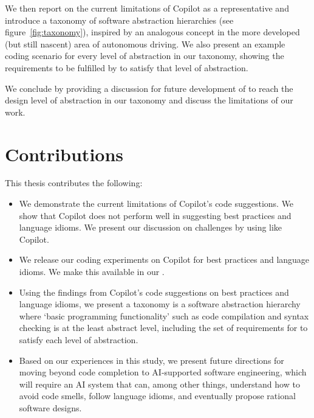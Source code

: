 We then report on the current limitations of Copilot as a representative \cct{} and introduce a taxonomy of software abstraction hierarchies (see figure~\ref{fig:taxonomy}), inspired by an analogous concept in the more developed (but still nascent) area of autonomous driving. 
We also present an example coding scenario for every level of abstraction in our taxonomy, showing the requirements to be fulfilled by \cct{} to satisfy that level of abstraction.

We conclude by providing a discussion for future development of \cct{} to reach the design level of abstraction in our taxonomy and discuss the limitations of our work. 

\section{Contributions}

This thesis contributes the following:

\begin{itemize}
    \item We demonstrate the current limitations of Copilot's code suggestions. We show that Copilot does not perform well in suggesting best practices and language idioms. We present our discussion on challenges by using \cct{} like Copilot.
    \item We release our coding experiments on Copilot for best practices and language idioms. We make this available in our \repl{}.
    \item Using the findings from Copilot's code suggestions on best practices and language idioms, we present a taxonomy is a software abstraction hierarchy where ‘basic programming functionality’ such as code compilation and syntax checking is at the least abstract level, including the set of requirements for \cct{} to satisfy each level of abstraction.
    \item Based on our experiences in this study, we present future directions for moving beyond code completion to AI-supported software engineering, which will require an AI system that can, among other things, understand how to avoid code smells, follow language idioms, and eventually propose rational software designs.
\end{itemize}